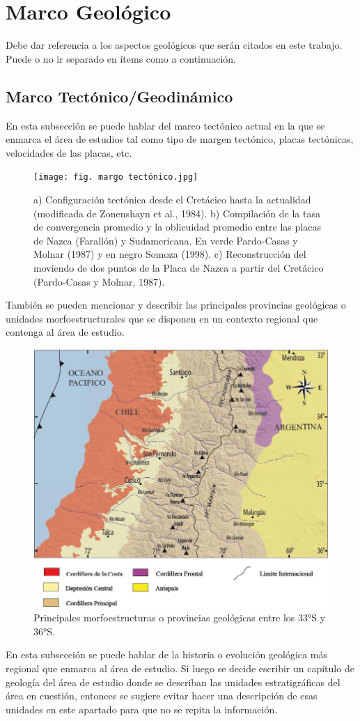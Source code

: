 \setcounter{figure}{0} %
\renewcommand{\thefigure}{\thesection.\arabic{figure}}
\section{\Large Marco Geológico}
Debe dar referencia a los aspectos geológicos que serán citados en este trabajo. Puede o no ir separado en ítems como a continuación.
        \subsection{\large Marco Tectónico/Geodinámico}
        En esta subsección se puede hablar del marco tectónico actual en la que se enmarca el área de estudios tal como tipo de margen tectónico, placas tectónicas, velocidades de las placas, etc.

        \begin{figure} [h]
            \centering
            \texttt{[image: fig. margo tectónico.jpg]}
            \caption{\small a) Configuración tectónica desde el Cretácico hasta la actualidad (modificada de Zonenshayn et al., 1984). b) Compilación de la tasa de convergencia promedio y la oblicuidad promedio entre las placas de Nazca (Farallón) y Sudamericana. En verde Pardo-Casas y Molnar (1987) y en negro Somoza (1998). c) Reconstrucción del moviendo de dos puntos de la Placa de Nazca a partir del Cretácico (Pardo-Casas y Molnar, 1987).}
            \label{fig:enter-label}
        \end{figure}
              
        También se pueden mencionar y describir las principales provincias geológicas o unidades morfoestructurales que se disponen en un contexto regional que contenga al área de estudio.

        
        \begin{figure} [h]
            \centering
            \includegraphics[width=0.5\linewidth]{Fig. provincias.jpg}
            \caption{\small Principales morfoestructuras o provincias geológicas entre los 33°S y 36°S.}
            \label{fig:enter-label}
        \end{figure}
       
        
        En esta subsección se puede hablar de la historia o evolución geológica más regional que enmarca al área de estudio. Si luego se decide escribir un capítulo de geología del área de estudio donde se describan las unidades estratigráficas del área en cuestión, entonces se sugiere evitar hacer una descripción de esas unidades en este apartado para que no se repita la información.    